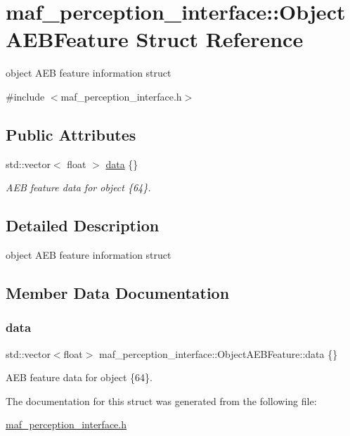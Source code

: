 \hypertarget{structmaf__perception__interface_1_1ObjectAEBFeature}{}\section{maf\+\_\+perception\+\_\+interface\+:\+:Object\+A\+E\+B\+Feature Struct Reference}
\label{structmaf__perception__interface_1_1ObjectAEBFeature}


object A\+EB feature information struct  




{\ttfamily \#include $<$maf\+\_\+perception\+\_\+interface.\+h$>$}

\subsection*{Public Attributes}
\begin{DoxyCompactItemize}
\item 
std\+::vector$<$ float $>$ \hyperlink{structmaf__perception__interface_1_1ObjectAEBFeature_adbe4d072a554051976fe6f653ef616aa}{data} \{\}
\begin{DoxyCompactList}\small\item\em A\+EB feature data for object \{64\}. \end{DoxyCompactList}\end{DoxyCompactItemize}


\subsection{Detailed Description}
object A\+EB feature information struct 

\subsection{Member Data Documentation}
\mbox{\label{structmaf__perception__interface_1_1ObjectAEBFeature_adbe4d072a554051976fe6f653ef616aa}} 
\subsubsection{\texorpdfstring{data}{data}}
{\footnotesize\ttfamily std\+::vector$<$float$>$ maf\+\_\+perception\+\_\+interface\+::\+Object\+A\+E\+B\+Feature\+::data \{\}}



A\+EB feature data for object \{64\}. 



The documentation for this struct was generated from the following file\+:\begin{DoxyCompactItemize}
\item 
\hyperlink{maf__perception__interface_8h}{maf\+\_\+perception\+\_\+interface.\+h}\end{DoxyCompactItemize}
